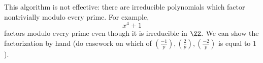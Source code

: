 \documentclass[../notes.tex]{subfiles}
\begin{document}
\begin{remark}[Nir]
	This algorithm is not effective: there are irreducible polynomials which factor nontrivially modulo every prime. For example,
	\[x^4+1\]
	factors modulo every prime even though it is irreducible in $\ZZ.$ We can show the factorization by hand (do casework on which of $\left(\frac{-1}p\right),\left(\frac2p\right),\left(\frac{-2}p\right)$ is equal to $1$).
\end{remark}
\end{document}
